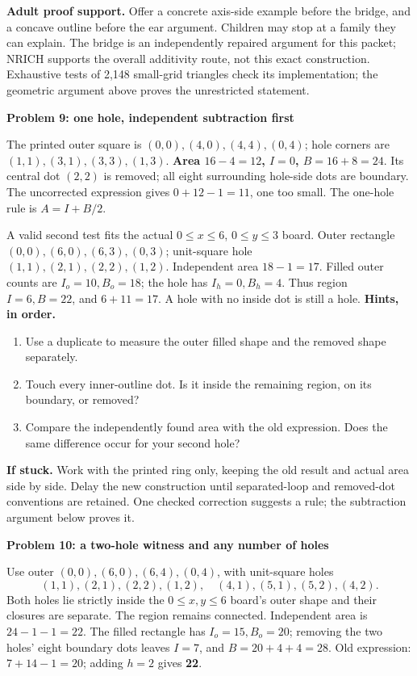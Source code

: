 \documentclass[letterpaper,11pt]{article}
\newcommand{\heading}[1]{\vspace{3pt}{\large\bfseries #1}\par}
\newcommand{\subhead}[1]{\vspace{2pt}\textbf{#1}\par}
\newcommand{\hints}[3]{\textbf{Hints, in order.}\begin{enumerate}\item #1\item #2\item #3\end{enumerate}}
\begin{document}
\textbf{Adult proof support.} Offer a concrete axis-side example before the bridge, and a concave outline before the ear argument. Children may stop at a family they can explain. The bridge is an independently repaired argument for this packet; NRICH supports the overall additivity route, not this exact construction. Exhaustive tests of 2,148 small-grid triangles check its implementation; the geometric argument above proves the unrestricted statement.
\newpage

\heading{Problems 9--10 / student pp.\,9--10 / holes after the core}
\subhead{Problem 9: one hole, independent subtraction first}
The printed outer square is $(0,0),\allowbreak(4,0),\allowbreak(4,4),\allowbreak(0,4)$; hole corners are $(1,1),\allowbreak(3,1),\allowbreak(3,3),\allowbreak(1,3)$. \textbf{Area $16-4=12$, $I=0$, $B=16+8=24$}. Its central dot $(2,2)$ is removed; all eight surrounding hole-side dots are boundary. The uncorrected expression gives $0+12-1=11$, one too small. The one-hole rule is $A=I+B/2$.

A valid second test fits the actual $0\leq x\leq6$, $0\leq y\leq3$ board. Outer rectangle $(0,0),\allowbreak(6,0),\allowbreak(6,3),\allowbreak(0,3)$; unit-square hole $(1,1),\allowbreak(2,1),\allowbreak(2,2),\allowbreak(1,2)$. Independent area $18-1=17$. Filled outer counts are $I_o=10,B_o=18$; the hole has $I_h=0,B_h=4$. Thus region $I=6,B=22$, and $6+11=17$. A hole with no inside dot is still a hole.
\hints{Use a duplicate to measure the outer filled shape and the removed shape separately.}{Touch every inner-outline dot. Is it inside the remaining region, on its boundary, or removed?}{Compare the independently found area with the old expression. Does the same difference occur for your second hole?}
\textbf{If stuck.} Work with the printed ring only, keeping the old result and actual area side by side. Delay the new construction until separated-loop and removed-dot conventions are retained. One checked correction suggests a rule; the subtraction argument below proves it.

\subhead{Problem 10: a two-hole witness and any number of holes}
Use outer $(0,0),\allowbreak(6,0),\allowbreak(6,4),\allowbreak(0,4)$, with unit-square holes
\[(1,1),\allowbreak(2,1),\allowbreak(2,2),\allowbreak(1,2),\quad (4,1),\allowbreak(5,1),\allowbreak(5,2),\allowbreak(4,2).\]
Both holes lie strictly inside the $0\leq x,y\leq6$ board's outer shape and their closures are separate. The region remains connected. Independent area is $24-1-1=22$. The filled rectangle has $I_o=15,B_o=20$; removing the two holes' eight boundary dots leaves $I=7$, and $B=20+4+4=28$. Old expression: $7+14-1=20$; adding $h=2$ gives \textbf{22}.
\end{document}
